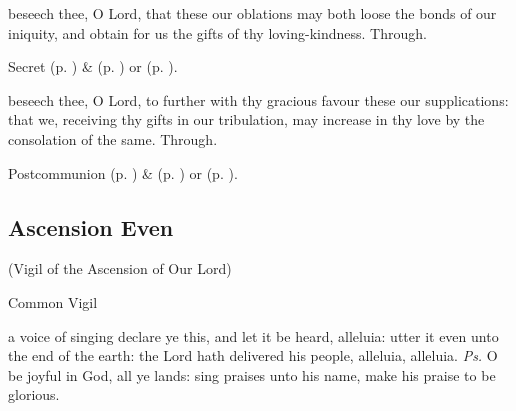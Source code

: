 
\secret
{} beseech thee, O Lord, that these our oblations may both loose the bonds of our iniquity, and obtain for us the gifts of thy loving-kindness. Through.
\begin{rubric}
     Secret  (p. \pageref{SPMaryInEaster}) \&   (p. \pageref{SPAgainst}) or  (p. \pageref{SPChiefBishop}).
\end{rubric}


\postcommunion
{} beseech thee, O Lord, to further with thy gracious favour these our supplications: that we, receiving thy gifts in our tribulation, may increase in thy love by the consolation of the same. Through.
\begin{rubric}
     Postcommunion  (p. \pageref{SPMaryInEaster}) \&   (p. \pageref{SPAgainst}) or  (p. \pageref{SPChiefBishop}).
\end{rubric}


\clearpage
\subsection{Ascension Even}

\centerline{\small{(Vigil of the Ascension of Our Lord)}}

\begin{inhead}
	Common Vigil
\end{inhead}


\introit
{} a voice of singing declare ye this, and let it be heard, alleluia: utter it even unto the end of the earth: the Lord hath delivered his people, alleluia, alleluia. \textit{Ps.} O be joyful in God, all ye lands: sing praises unto his name, make his praise to be glorious.

